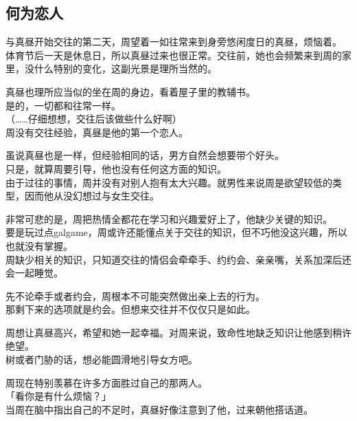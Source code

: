 \subsection{何为恋人}

与真昼开始交往的第二天，周望着一如往常来到身旁悠闲度日的真昼，烦恼着。\\

体育节后一天是休息日，所以真昼过来也很正常。交往前，她也会频繁来到周的家里，没什么特别的变化，这副光景是理所当然的。

真昼也理所应当似的坐在周的身边，看着屋子里的教辅书。\\

是的，一切都和往常一样。\\

（……仔细想想，交往后该做些什么好啊）\\

周没有交往经验，真昼是他的第一个恋人。

虽说真昼也是一样，但经验相同的话，男方自然会想要带个好头。\\

只是，就算周要引导，他也没有任何这方面的知识。\\

由于过往的事情，周并没有对别人抱有太大兴趣。就男性来说周是欲望较低的类型，因而他从没幻想过与女生交往。

非常可悲的是，周把热情全都花在学习和兴趣爱好上了，他缺少关键的知识。\\

要是玩过点galgame，周或许还能懂点关于交往的知识，但不巧他没这兴趣，所以也就没有掌握。\\

周缺少相关的知识，只知道交往的情侣会牵牵手、约约会、亲亲嘴，关系加深后还会一起睡觉。

先不论牵手或者约会，周根本不可能突然做出亲上去的行为。\\

那剩下来的选项就是约会。但想来交往并不仅仅只是如此。

周想让真昼高兴，希望和她一起幸福。对周来说，致命性地缺乏知识让他感到稍许绝望。\\

树或者门胁的话，想必能圆滑地引导女方吧。

周现在特别羡慕在许多方面胜过自己的那两人。\\

「看你是有什么烦恼？」\\

当周在脑中指出自己的不足时，真昼好像注意到了他，过来朝他搭话道。\\

